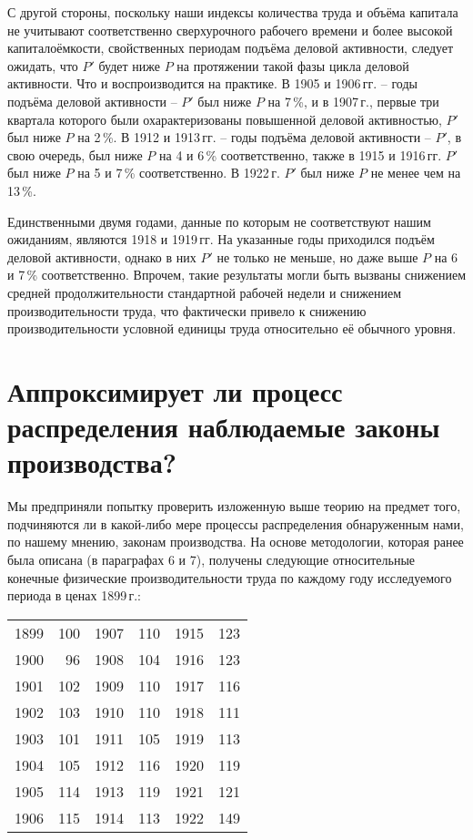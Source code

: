 \documentclass[leqno]{article}  %
\begin{document}
\begin{enumerate}[{(1)}]
\end{enumerate}
С другой стороны, поскольку наши индексы количества труда и объёма капитала не учитывают соответственно сверхурочного рабочего времени и более высокой капиталоёмкости, свойственных периодам подъёма деловой активности, следует ожидать, что \(P'\) будет ниже \(P\) на протяжении такой фазы цикла деловой активности. Что и воспроизводится на практике. В 1905 и 1906\,гг. -- годы подъёма деловой активности -- \(P'\) был ниже \(P\) на 7\,\%, и в 1907\,г., первые три квартала которого были охарактеризованы повышенной деловой активностью, \(P'\) был ниже \(P\) на 2\,\%. В 1912 и 1913\,гг. -- годы подъёма деловой активности -- \(P'\), в свою очередь, был ниже \(P\) на 4 и 6\,\% соответственно, также в 1915 и 1916\,гг. \(P'\) был ниже \(P\) на 5 и 7\,\% соответственно. В 1922\,г. \(P'\) был ниже \(P\) не менее чем на 13\,\%.
\par
Единственными двумя годами, данные по которым не соответствуют нашим ожиданиям, являются 1918 и 1919\,гг. На указанные годы приходился подъём деловой активности, однако в них \(P'\)
не только не меньше, но даже выше \(P\) на 6 и 7\,\% соответственно. Впрочем, такие результаты могли быть вызваны снижением средней продолжительности стандартной рабочей недели и снижением производительности труда, что фактически привело к снижению производительности условной единицы труда относительно её обычного уровня.

\section{Аппроксимирует ли процесс распределения наблюдаемые законы производства?}

Мы предприняли попытку проверить изложенную выше теорию на предмет того, подчиняются ли в какой-либо мере процессы распределения обнаруженным нами, по нашему мнению, законам производства. На основе методологии, которая ранее была описана (в параграфах 6 и 7), получены следующие относительные конечные физические производительности труда по каждому году исследуемого периода в ценах 1899\,г.:
\par

\begin{table}[!h]
\centering
\footnotesize{
\begin{tabular}{r@{~\ldots~}rr@{~\ldots~}lr@{~\ldots~}l}
1899 & 100 & 1907 & 110 & 1915 & 123 \\
1900 & 96 & 1908 & 104 & 1916 & 123 \\
1901 & 102 & 1909 & 110 & 1917 & 116 \\
1902 & 103 & 1910 & 110 & 1918 & 111 \\
1903 & 101 & 1911 & 105 & 1919 & 113 \\
1904 & 105 & 1912 & 116 & 1920 & 119 \\
1905 & 114 & 1913 & 119 & 1921 & 121 \\
1906 & 115 & 1914 & 113 & 1922 & 149
\end{tabular}
}
\end{table}
\end{document}
